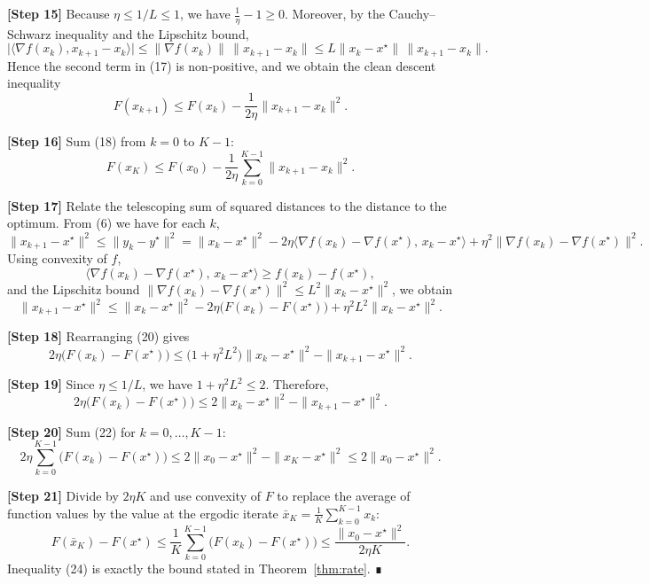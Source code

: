 \documentclass[11pt]{article}
\begin{document}
\begin{enumerate}[label={(\alph*)}]
\noindent\textbf{[Step 15]} Because $\eta\le 1/L\le 1$, we have $\frac{1}{\eta}-1\ge0$. Moreover, by the Cauchy–Schwarz inequality and the Lipschitz bound,
\[
\big|\langle\nabla f(x_{k}),x_{k+1}-x_{k}\rangle\big|
\le \|\nabla f(x_{k})\|\,\|x_{k+1}-x_{k}\|
\le L\|x_{k}-x^{\star}\|\,\|x_{k+1}-x_{k}\|.
\]
Hence the second term in (17) is non‑positive, and we obtain the clean descent inequality
\[
F(x_{k+1})\le F(x_{k})-\frac{1}{2\eta}\|x_{k+1}-x_{k}\|^{2}.
\tag{18}
\]

\noindent\textbf{[Step 16]} Sum (18) from $k=0$ to $K-1$:
\[
F(x_{K})\le F(x_{0})-\frac{1}{2\eta}\sum_{k=0}^{K-1}\|x_{k+1}-x_{k}\|^{2}.
\tag{19}
\]

\noindent\textbf{[Step 17]} Relate the telescoping sum of squared distances to the distance to the optimum. From (6) we have for each $k$,
\[
\|x_{k+1}-x^{\star}\|^{2}\le\|y_{k}-y^{\star}\|^{2}
= \|x_{k}-x^{\star}\|^{2}-2\eta\langle\nabla f(x_{k})-\nabla f(x^{\star}),\,x_{k}-x^{\star}\rangle
+\eta^{2}\|\nabla f(x_{k})-\nabla f(x^{\star})\|^{2}.
\]
Using convexity of $f$,
\[
\langle\nabla f(x_{k})-\nabla f(x^{\star}),\,x_{k}-x^{\star}\rangle\ge f(x_{k})-f(x^{\star}),
\]
and the Lipschitz bound $\|\nabla f(x_{k})-\nabla f(x^{\star})\|^{2}\le L^{2}\|x_{k}-x^{\star}\|^{2}$, we obtain
\[
\|x_{k+1}-x^{\star}\|^{2}
\le \|x_{k}-x^{\star}\|^{2}
-2\eta\bigl(F(x_{k})-F(x^{\star})\bigr)
+\eta^{2}L^{2}\|x_{k}-x^{\star}\|^{2}.
\tag{20}
\]

\noindent\textbf{[Step 18]} Rearranging (20) gives
\[
2\eta\bigl(F(x_{k})-F(x^{\star})\bigr)
\le \bigl(1+\eta^{2}L^{2}\bigr)\|x_{k}-x^{\star}\|^{2}
-\|x_{k+1}-x^{\star}\|^{2}.
\tag{21}
\]

\noindent\textbf{[Step 19]} Since $\eta\le 1/L$, we have $1+\eta^{2}L^{2}\le 2$. Therefore,
\[
2\eta\bigl(F(x_{k})-F(x^{\star})\bigr)
\le 2\|x_{k}-x^{\star}\|^{2}
-\|x_{k+1}-x^{\star}\|^{2}.
\tag{22}
\]

\noindent\textbf{[Step 20]} Sum (22) for $k=0,\dots,K-1$:
\[
2\eta\sum_{k=0}^{K-1}\bigl(F(x_{k})-F(x^{\star})\bigr)
\le 2\|x_{0}-x^{\star}\|^{2}
-\|x_{K}-x^{\star}\|^{2}
\le 2\|x_{0}-x^{\star}\|^{2}.
\tag{23}
\]

\noindent\textbf{[Step 21]} Divide by $2\eta K$ and use convexity of $F$ to replace the average of function values by the value at the ergodic iterate $\bar{x}_{K}=\frac{1}{K}\sum_{k=0}^{K-1}x_{k}$:
\[
F(\bar{x}_{K})-F(x^{\star})
\le \frac{1}{K}\sum_{k=0}^{K-1}\bigl(F(x_{k})-F(x^{\star})\bigr)
\le \frac{\|x_{0}-x^{\star}\|^{2}}{2\eta K}.
\tag{24}
\]
Inequality (24) is exactly the bound stated in Theorem~\ref{thm:rate}. ∎


\end{enumerate}
\end{document}
